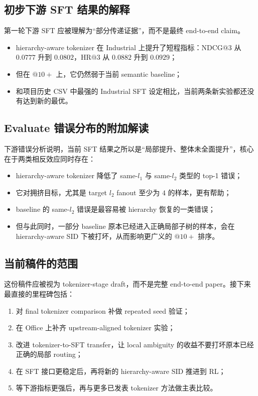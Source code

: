 \subsection{初步下游 SFT 结果的解释}

第一轮下游 SFT 应被理解为“部分传递证据”，而不是最终 end-to-end claim。
\begin{itemize}[leftmargin=1.4em]
  \item hierarchy-aware tokenizer 在 Industrial 上提升了短程指标：$\mathrm{NDCG}@3$ 从 $0.0777$ 升到 $0.0802$，$\mathrm{HR}@3$ 从 $0.0882$ 升到 $0.0929$；
  \item 但在 $@10+$ 上，它仍然弱于当前 semantic baseline；
  \item 和项目历史 CSV 中最强的 Industrial SFT 设定相比，当前两条新实验都还没有达到新的最优。
\end{itemize}

\subsection{Evaluate 错误分布的附加解读}

下游错误分析说明，当前 SFT 结果之所以是“局部提升、整体未全面提升”，核心在于两类相反效应同时存在：
\begin{itemize}[leftmargin=1.4em]
  \item hierarchy-aware tokenizer 降低了 same-$l_1$ 与 same-$l_2$ 类型的 top-1 错误；
  \item 它对拥挤目标，尤其是 target $l_2$ fanout 至少为 $4$ 的样本，更有帮助；
  \item baseline 的 same-$l_2$ 错误是最容易被 hierarchy 恢复的一类错误；
  \item 但与此同时，一部分 baseline 原本已经进入正确局部子树的样本，会在 hierarchy-aware SID 下被打坏，从而影响更广义的 $@10+$ 排序。
\end{itemize}

\subsection{当前稿件的范围}

这份稿件应被视为 tokenizer-stage draft，而不是完整 end-to-end paper。接下来最直接的里程碑包括：
\begin{enumerate}[leftmargin=1.4em]
  \item 对 final tokenizer comparison 补做 repeated seed 验证；
  \item 在 Office 上补齐 upstream-aligned tokenizer 实验；
  \item 改进 tokenizer-to-SFT transfer，让 local ambiguity 的收益不要打坏原本已经正确的局部 routing；
  \item 在 SFT 接口更稳定后，再将新的 hierarchy-aware SID 推进到 RL；
  \item 等下游指标更强后，再与更多已发表 tokenizer 方法做主表比较。
\end{enumerate}
